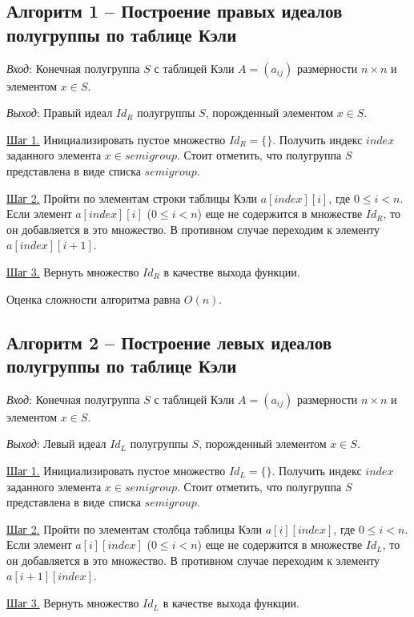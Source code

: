 \documentclass[bachelor, och, labwork]{shiza}
\begin{document}
    \subsection{Алгоритм 1 -- Построение правых идеалов полугруппы по таблице Кэли}

    \textit{Вход}: Конечная полугруппа $S$ с таблицей Кэли $A = (a_{ij})$ размерности $n \times n$ и элементом $x \in S$.

    \textit{Выход}: Правый идеал $Id_R$ полугруппы $S$, порожденный элементом $x \in S$.
    
    \underline{Шаг 1.} Инициализировать пустое множество $Id_R = \{\}$. Получить индекс $index$ заданного элемента $x \in semigroup$.
    Стоит отметить, что полугруппа $S$ представлена в виде списка $semigroup$.
    
    \underline{Шаг 2.} Пройти по элементам строки таблицы Кэли $a[index][i]$, где $0 \leq i < n$. Если элемент $a[index][i]$ ($0 \leq i < n$) еще не содержится
    в множестве $Id_R$, то он добавляется в это множество. В противном случае переходим к элементу $a[index][i + 1]$.
    
    \underline{Шаг 3.} Вернуть множество $Id_R$ в качестве выхода функции.
    
      Оценка сложности алгоритма равна $O(n)$.

      \subsection{Алгоритм 2 -- Построение левых идеалов полугруппы по таблице Кэли}

    \textit{Вход}: Конечная полугруппа $S$ с таблицей Кэли $A = (a_{ij})$ размерности $n \times n$ и элементом $x \in S$.

    \textit{Выход}: Левый идеал $Id_L$ полугруппы $S$, порожденный элементом $x \in S$.
    
    \underline{Шаг 1.} Инициализировать пустое множество $Id_L = \{\}$. Получить индекс $index$ заданного элемента $x \in semigroup$.
    Стоит отметить, что полугруппа $S$ представлена в виде списка $semigroup$.
    
    \underline{Шаг 2.} Пройти по элементам столбца таблицы Кэли $a[i][index]$, где $0 \leq i < n$. Если элемент $a[i][index]$ ($0 \leq i < n$)
    еще не содержится в множестве $Id_L$, то он добавляется в это множество. В противном случае переходим к элементу $a[i + 1][index]$.
    
    \underline{Шаг 3.} Вернуть множество $Id_L$ в качестве выхода функции.
    
\end{document}
